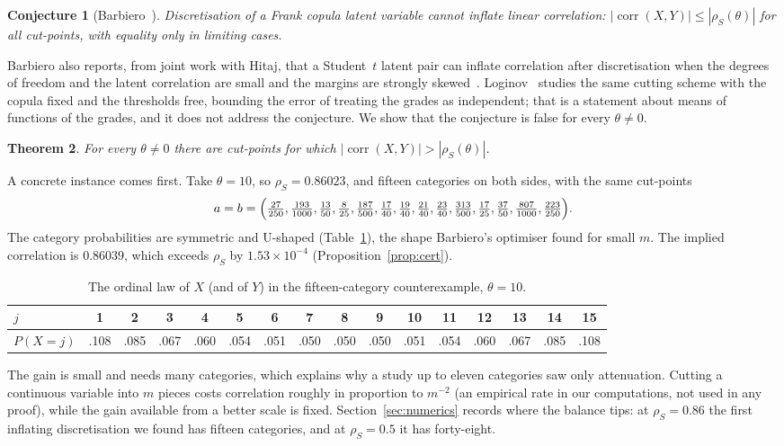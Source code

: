 \documentclass[11pt]{amsart}
\newtheorem{thm}{Theorem}[section]
\newtheorem{conj}[thm]{Conjecture}
\theoremstyle{definition}
\DeclareMathOperator{\corr}{corr}
\newcommand{\rs}{\rho_S}
\begin{document}
\begin{conj}[Barbiero~{\cite[Sections~2.2 and~5]{Barbiero}}]\label{conj}
Discretisation of a Frank copula latent variable cannot inflate linear correlation: $|\corr(X,Y)|\le|\rs(\theta)|$
for all cut-points, with equality only in limiting cases.
\end{conj}

Barbiero also reports, from joint work with Hitaj, that a Student~$t$ latent pair can inflate correlation after
discretisation when the degrees of freedom and the latent correlation are small and the margins are strongly
skewed~\cite[Section~2.2]{Barbiero}. Loginov~\cite{Loginov} studies the same cutting scheme with the copula fixed and
the thresholds free, bounding the error of treating the grades as independent; that is a statement about means of
functions of the grades, and it does not address the conjecture. We show that the conjecture is false for every
$\theta\ne0$.

\begin{thm}\label{thm:main}
For every $\theta\ne0$ there are cut-points for which $|\corr(X,Y)|>|\rs(\theta)|$.
\end{thm}

A concrete instance comes first. Take $\theta=10$, so $\rs=0.86023$, and fifteen categories on both sides, with the
same cut-points
\[
a=b=\Bigl(\tfrac{27}{250},\tfrac{193}{1000},\tfrac{13}{50},\tfrac{8}{25},\tfrac{187}{500},\tfrac{17}{40},
\tfrac{19}{40},\tfrac{21}{40},\tfrac{23}{40},\tfrac{313}{500},\tfrac{17}{25},\tfrac{37}{50},\tfrac{807}{1000},
\tfrac{223}{250}\Bigr).
\]
The category probabilities are symmetric and U-shaped (Table~\ref{tab:example}), the shape Barbiero's optimiser
found for small $m$. The implied correlation is $0.86039$, which exceeds $\rs$ by $1.53\times10^{-4}$
(Proposition~\ref{prop:cert}).

\begin{table}[h]
\centering\footnotesize\setlength{\tabcolsep}{4pt}
\begin{tabular}{@{}l*{15}{c}@{}}
\toprule
$j$ & 1&2&3&4&5&6&7&8&9&10&11&12&13&14&15\\
\midrule
$P(X=j)$ & .108&.085&.067&.060&.054&.051&.050&.050&.050&.051&.054&.060&.067&.085&.108\\
\bottomrule
\end{tabular}
\caption{The ordinal law of $X$ (and of $Y$) in the fifteen-category counterexample, $\theta=10$.}\label{tab:example}
\end{table}

The gain is small and needs many categories, which explains why a study up to eleven categories saw only
attenuation. Cutting a continuous variable into $m$ pieces costs correlation roughly in proportion to $m^{-2}$ (an
empirical rate in our computations, not used in any proof), while the gain available from a better scale is fixed. Section~\ref{sec:numerics} records where the balance tips: at
$\rs=0.86$ the first inflating discretisation we found has fifteen categories, and at $\rs=0.5$ it has
forty-eight.
\end{document}
